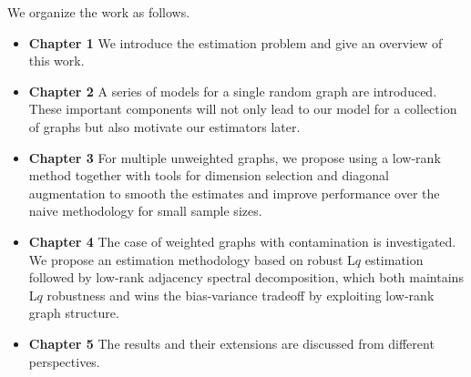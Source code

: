 We organize the work as follows.
\begin{itemize}
\item {\bf{Chapter 1}} We introduce the estimation problem and give an overview of this work.
\item {\bf{Chapter 2}} A series of models for a single random graph are introduced. These important components will not only lead to our model for a collection of graphs but also motivate our estimators later.
\item {\bf{Chapter 3}} For multiple unweighted graphs, we propose using a low-rank method together with tools for dimension selection and diagonal augmentation to smooth the estimates and improve performance over the naive methodology for small sample sizes.
\item {\bf{Chapter 4}} The case of weighted graphs with contamination is investigated. We propose an estimation methodology based on robust L$q$ estimation followed by low-rank adjacency spectral decomposition, which both maintains L$q$ robustness and wins the bias-variance tradeoff by exploiting low-rank graph structure.
\item {\bf{Chapter 5}} The results and their extensions are discussed from different perspectives.
\end{itemize}
